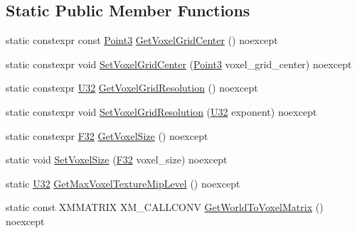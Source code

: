 \subsection*{Static Public Member Functions}
\begin{DoxyCompactItemize}
\item 
static constexpr const \mbox{\hyperlink{structmage_1_1_point3}{Point3}} \mbox{\hyperlink{classmage_1_1rendering_1_1_voxelization_settings_af246454d2acf7f7f37edaa2ac6d64458}{Get\+Voxel\+Grid\+Center}} () noexcept
\item 
static constexpr void \mbox{\hyperlink{classmage_1_1rendering_1_1_voxelization_settings_aadb28ee2786ec5f84f6b4d22ae8ddf57}{Set\+Voxel\+Grid\+Center}} (\mbox{\hyperlink{structmage_1_1_point3}{Point3}} voxel\+\_\+grid\+\_\+center) noexcept
\item 
static constexpr \mbox{\hyperlink{namespacemage_a41c104c036fba3756a74e19f793eeaa1}{U32}} \mbox{\hyperlink{classmage_1_1rendering_1_1_voxelization_settings_a0a940986058f36311aea31331cb18c14}{Get\+Voxel\+Grid\+Resolution}} () noexcept
\item 
static constexpr void \mbox{\hyperlink{classmage_1_1rendering_1_1_voxelization_settings_a106df60538c535ffad8d42b5db49e59a}{Set\+Voxel\+Grid\+Resolution}} (\mbox{\hyperlink{namespacemage_a41c104c036fba3756a74e19f793eeaa1}{U32}} exponent) noexcept
\item 
static constexpr \mbox{\hyperlink{namespacemage_aa97e833b45f06d60a0a9c4fc22ae02c0}{F32}} \mbox{\hyperlink{classmage_1_1rendering_1_1_voxelization_settings_a510d2c8d3d5ebcb88617a0e717f64723}{Get\+Voxel\+Size}} () noexcept
\item 
static void \mbox{\hyperlink{classmage_1_1rendering_1_1_voxelization_settings_a4e1c575474a1301981bc0a0070c2c841}{Set\+Voxel\+Size}} (\mbox{\hyperlink{namespacemage_aa97e833b45f06d60a0a9c4fc22ae02c0}{F32}} voxel\+\_\+size) noexcept
\item 
static \mbox{\hyperlink{namespacemage_a41c104c036fba3756a74e19f793eeaa1}{U32}} \mbox{\hyperlink{classmage_1_1rendering_1_1_voxelization_settings_aacf64e0e4be2e7260793dfefe7f332cb}{Get\+Max\+Voxel\+Texture\+Mip\+Level}} () noexcept
\item 
static const X\+M\+M\+A\+T\+R\+IX X\+M\+\_\+\+C\+A\+L\+L\+C\+O\+NV \mbox{\hyperlink{classmage_1_1rendering_1_1_voxelization_settings_ac0eb16df3bfae7218b27e1c1cdf1399f}{Get\+World\+To\+Voxel\+Matrix}} () noexcept
\end{DoxyCompactItemize}
